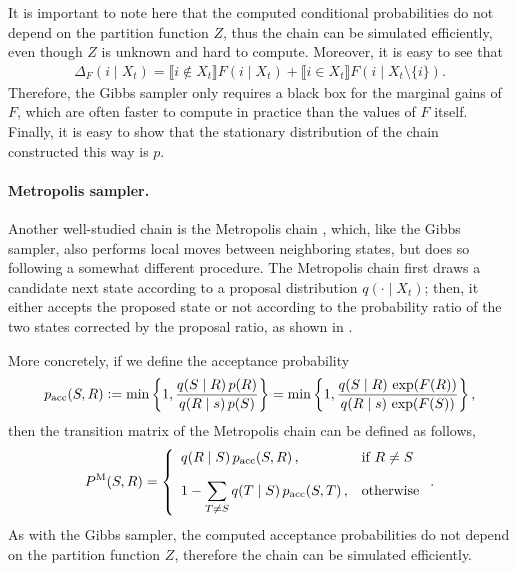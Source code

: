 It is important to note here that the computed conditional probabilities do not depend on the partition function $Z$, thus the chain can be simulated efficiently, even though $Z$ is unknown and hard to compute.
Moreover, it is easy to see that
\begin{align*}
\Delta_F(i \mid X_t) = \llbracket i\not\in X_t\rrbracket F(i \mid X_t) + \llbracket i\in X_t\rrbracket F(i \mid X_t\setminus\{i\}).
\end{align*}
Therefore, the Gibbs sampler only requires a black box for the marginal gains of $F$, which are often faster to compute in practice than the values of $F$ itself.
Finally, it is easy to show that the stationary distribution of the chain constructed this way is $p$.

\paragraph{Metropolis sampler.}
Another well-studied chain is the Metropolis chain \citep{metropolis,hastings}, which, like the Gibbs sampler, also performs local moves between neighboring states, but does so following a somewhat different procedure.
The Metropolis chain first draws a candidate next state according to a proposal distribution $q(\cdot \mid X_t)$; then, it either accepts the proposed state or not according to the probability ratio of the two states corrected by the proposal ratio, as shown in .


More concretely, if we define the acceptance probability
\begin{align*}
  p_{\textrm{acc}}(S, R) \vcentcolon= \min\left\{1, \displaystyle\frac{q(S \mid R)\,p(R)}{q(R \mid s)\,p(S)}\right\} = \min\left\{1, \displaystyle\frac{q(S \mid R)\,\exp(F(R))}{q(R \mid s)\,\exp(F(S))}\right\},
\end{align*}
then the transition matrix of the Metropolis chain can be defined as follows,
\begin{align*}
  \Pm(S, R) = \twopartdefo{q(R \mid S)\,p_{\textrm{acc}}(S, R)}{R \neq S\vspace{1em}}{1 - \displaystyle\sum_{T \neq S} q(T \mid S)\,p_{\textrm{acc}}(S, T)}.
\end{align*}
As with the Gibbs sampler, the computed acceptance probabilities do not depend on the partition function $Z$, therefore the chain can be simulated efficiently.

